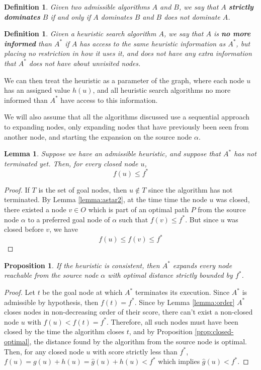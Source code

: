 \documentclass[a4paper,10pt]{report}
\newtheorem{definition}[theorem]{Definition}
\newtheorem{proposition}[theorem]{Proposition}
\newtheorem{lemma}[theorem]{Lemma}
\begin{document}
\begin{definition}
Given two admissible algorithms $A$ and $B$, we say that $A$ \textbf{strictly dominates} $B$ if and only if $A$ dominates $B$ and $B$ does not dominate $A$.
\end{definition}

\begin{definition}
Given a heuristic search algorithm $A$, we say that $A$ is \textbf{no more informed} than $A^*$ if $A$ has access to the same heuristic information as $A^*$, but placing no restriction in how it uses it, and does not have any extra information that $A^*$ does not have about unvisited nodes.
\end{definition}

We can then treat the heuristic as a parameter of the graph, where each node $u$ has an assigned value $h(u)$, and all heuristic search algorithms no more informed than $A^*$ have access to this information.

We will also assume that all the algorithms discussed use a sequential approach to expanding nodes, only expanding nodes that have previously been seen from another node, and starting the expansion on the source node $\alpha$.

\begin{lemma}
\label{lemma:astar-opt}
Suppose we have an admissible heuristic, and suppose that $A^*$ has not terminated yet. Then, for every closed node $u$,
\[ f(u) \leq f^* \]
\end{lemma}
\begin{proof}
If $T$ is the set of goal nodes, then $u \not \in T$ since the algorithm has not terminated. By Lemma \ref{lemma:astar2}, at the time time the node $u$ was closed, there existed a node $v \in O$ which is part of an optimal path $P$ from the source node $\alpha$ to a preferred goal node of $\alpha$ such that $f(v) \leq f^*$.
But since $u$ was closed before $v$, we have
\[ f(u) \leq f(v) \leq f^* \]
\end{proof}

\begin{proposition}
\label{prop:surely}
If the heuristic is consistent, then $A^*$ expands every node reachable from the source node $\alpha$ with optimal distance strictly bounded by $f^*$.
\end{proposition}
\begin{proof}
Let $t$ be the goal node at which $A^*$ terminates its execution. Since $A^*$ is admissible by hypothesis, then $f(t) = f^*$. Since by Lemma \ref{lemma:order} $A^*$ closes nodes in non-decreasing order of their score, there can't exist a non-closed node $u$ with $f(u) < f(t) = f^*$. Therefore, all such nodes must have been closed by the time the algorithm closes $t$, and by Proposition \ref{prop:closed-optimal}, the distance found by the algorithm from the source node is optimal. Then, for any closed node $u$ with score strictly less than $f^*$, $f(u) = g(u) + h(u) = \hat{g}(u) + h(u) < f^*$ which implies $\hat{g}(u) < f^*$.
\end{proof}
\end{document}
